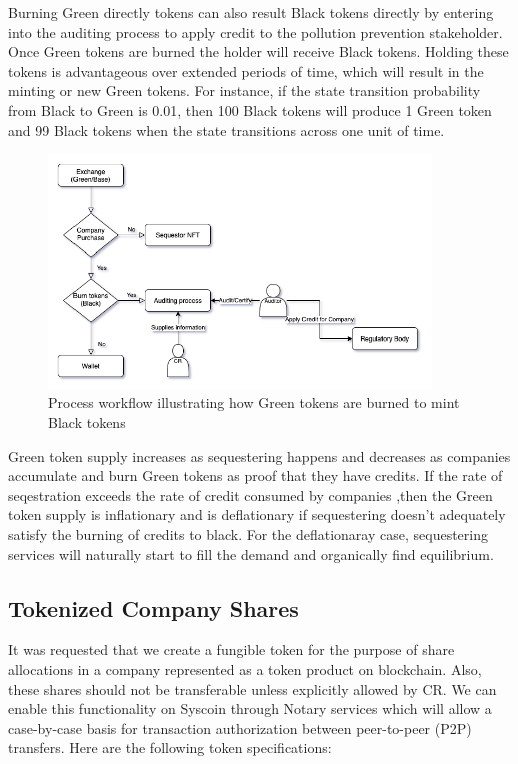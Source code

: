 \documentclass{article}
\begin{document}
Burning Green directly tokens can also result Black tokens directly by entering into the auditing process to apply credit to the pollution prevention stakeholder. Once Green tokens are burned the holder will receive Black tokens. Holding these tokens is advantageous over extended periods of time, which will result in the minting or new Green tokens. For instance, if the state transition probability from Black to Green is 0.01, then 100 Black tokens will produce 1 Green token and 99 Black tokens when the state transitions across one unit of time.

\begin{figure}[h]
\centering
\includegraphics[width=4in]{green_to_black.png}
\caption{ Process workflow illustrating how Green tokens are burned to mint Black tokens } 
\label{fig:green_to_black}
\end{figure} 

Green token supply increases as sequestering happens and decreases as companies accumulate and burn Green tokens as proof that they have credits. If the rate of seqestration exceeds the rate of credit consumed by companies ,then the Green token supply is inflationary and is deflationary if sequestering doesn’t adequately satisfy the burning of credits to black. For the deflationaray case, sequestering services will naturally start to fill the demand and organically find equilibrium.


\subsection{Tokenized Company Shares}

It was requested that we create a fungible token for the purpose of share allocations in a company represented as a token product on blockchain. Also, these shares should not be transferable unless explicitly allowed by CR. We can enable this functionality on Syscoin through Notary services which will allow a case-by-case basis for transaction authorization between peer-to-peer (P2P) transfers. Here are the following token specifications:
\end{document}
